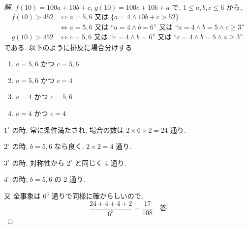 \documentclass[../main.tex]{subfiles}
\begin{document}
\begin{proof}[解]
  $f(10) = 100a + 10b + c, \, g(10) = 100c + 10b + a$ で, $1 \le a,b,c \le 6$ から,
  \begin{align*}
    f(10) > 452 &\iff a=5,6 \text{ 又は } \{a=4 \land 10b+c > 52\} \\
    &\iff a=5,6 \text{ 又は } \text{“}a=4 \land b=6\text{”} \text{ 又は } \text{“}a=4 \land b=5 \land c \ge 3\text{”} \\
    g(10) > 452 &\iff c=5,6 \text{ 又は } \text{“}c=4 \land b=6\text{”} \text{ 又は } \text{“}c=4 \land b=5 \land a \ge 3\text{”}
  \end{align*}
  である. 以下のように排反に場合分けする.
  \begin{enumerate}
    \item[$1^\circ$] $a=5,6$ かつ $c=5,6$
    \item[$2^\circ$] $a=5,6$ かつ $c=4$
    \item[$3^\circ$] $a=4$ かつ $c=5,6$
    \item[$4^\circ$] $a=4$ かつ $c=4$
  \end{enumerate}

  $1^\circ$ の時, 常に条件満たされ, 場合の数は $2 \times 6 \times 2 = 24$ 通り.

  $2^\circ$ の時, $b=5,6$ なら良く, $2 \times 2 = 4$ 通り.

  $3^\circ$ の時, 対称性から $2^\circ$ と同じく 4 通り.

  $4^\circ$ の時, $b=5,6$ の 2 通り.

  又 全事象は $6^3$ 通りで同様に確からしいので,
  \[ \frac{24 + 4 + 4 + 2}{6^3} = \frac{17}{108} \quad \text{答} \]
\end{proof}
\end{document}
